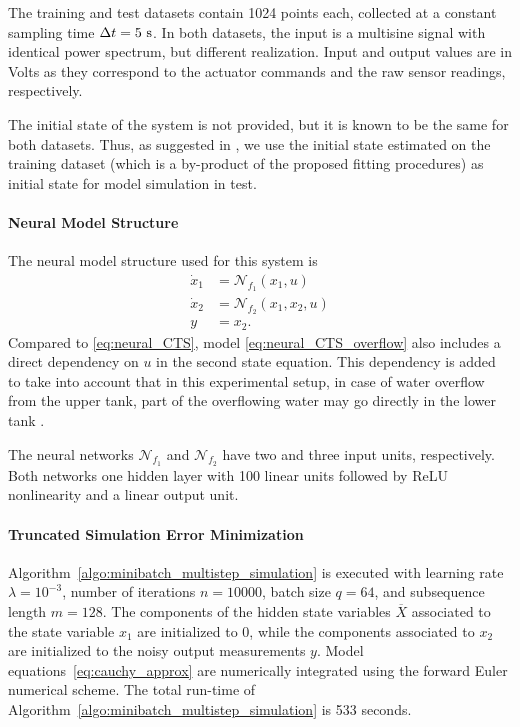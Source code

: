 \documentclass{article} %
\newcommand{\NN}{\mathcal{N}} %
\newcommand{\batchsize}{q}
\newcommand{\seqlen}{m}
\newcommand{\numiter}{n}
\newcommand{\hidden}[1]{\overline{#1}}
\begin{document}
The training and test datasets contain 1024 points each, collected at a constant sampling time $\Delta t=5~\rm{s}$. In both datasets, the input is a multisine signal with identical power spectrum, but different realization. 
Input and output values are in Volts as they correspond to the actuator commands and the raw sensor readings, respectively.

The initial state of the system is not provided, but it is known to be the same for both datasets. Thus, as suggested in \citep{schoukens2017three}, 
we use the initial state estimated on the training dataset (which is a by-product of the proposed fitting procedures) as initial state for model simulation in test.%

\paragraph{Neural Model Structure}
The neural model structure used for this system is 
\begin{subequations}
\label{eq:neural_CTS_overflow}
\begin{align}
 \dot x_1 &= \NN_{\!f_1}(x_1, u) \\
 \dot x_2 &= \NN_{\!f_2}(x_1, x_2, u) \\
      y   &= x_2.
\end{align}
\end{subequations}
Compared to \eqref{eq:neural_CTS}, model \eqref{eq:neural_CTS_overflow} also includes a direct dependency on $u$ in the second state equation. This dependency is added to take into account that in this experimental setup, in case of water overflow from the upper tank, part of the overflowing water may go directly in the lower tank \citep{schoukens2017three}.

The neural networks $\NN_{\!f_1}$ and $\NN_{\!f_2}$ have two and three input units, respectively. Both networks one hidden layer with 100 linear units followed by ReLU nonlinearity and a linear output unit.

\paragraph{Truncated Simulation Error Minimization}
Algorithm~\ref{algo:minibatch_multistep_simulation} is executed with learning rate $\lambda=10^{-3}$, number of iterations $\numiter=10000$,  batch size $\batchsize=64$, and subsequence length $\seqlen=128$. 
The  components of the hidden state variables $\hidden{X}$ associated to the state variable   $x_1$ are initialized to $0$, while the  components associated  to $x_2$ are initialized to the noisy output measurements $y$. Model equations~\eqref{eq:cauchy_approx} are numerically integrated using the forward Euler numerical scheme. 
The total run-time of Algorithm~\ref{algo:minibatch_multistep_simulation} is 533 seconds.
\end{document}
